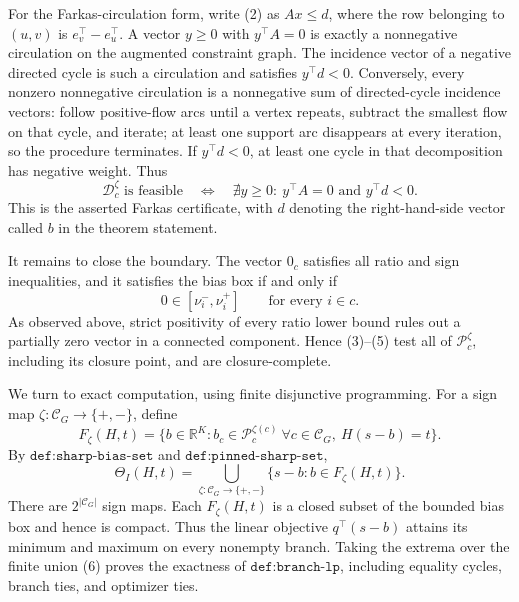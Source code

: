 For the Farkas-circulation form, write (2) as \(A x\le d\), where the row belonging to \((u,v)\) is \(e_v^{\top}-e_u^{\top}\).  A vector \(y\ge0\) with \(y^{\top}A=0\) is exactly a nonnegative circulation on the augmented constraint graph.  The incidence vector of a negative directed cycle is such a circulation and satisfies \(y^{\top}d<0\).  Conversely, every nonzero nonnegative circulation is a nonnegative sum of directed-cycle incidence vectors: follow positive-flow arcs until a vertex repeats, subtract the smallest flow on that cycle, and iterate; at least one support arc disappears at every iteration, so the procedure terminates.  If \(y^{\top}d<0\), at least one cycle in that decomposition has negative weight.  Thus
\[
 \mathcal D_c^{\zeta}\text{ is feasible}
 \quad\Longleftrightarrow\quad
 \nexists y\ge0:\ y^{\top}A=0\text{ and }y^{\top}d<0.
\tag{4}
\]
This is the asserted Farkas certificate, with \(d\) denoting the right-hand-side vector called \(b\) in the theorem statement.

It remains to close the boundary.  The vector \(0_c\) satisfies all ratio and sign inequalities, and it satisfies the bias box if and only if
\[
 0\in[\nu_i^-,\nu_i^+]\qquad\text{for every }i\in c.
\tag{5}
\]
As observed above, strict positivity of every ratio lower bound rules out a partially zero vector in a connected component.  Hence (3)--(5) test all of \(\mathcal P_c^{\zeta}\), including its closure point, and are closure-complete.

We turn to exact computation, using finite disjunctive programming.  For a sign map \(\zeta:\mathcal C_G\to\{+,-\}\), define
\[
 F_{\zeta}(H,t)
 =\{b\in\mathbb R^K:b_c\in\mathcal P_c^{\zeta(c)}\ \forall c\in\mathcal C_G,\ H(s-b)=t\}.
\]
By \(\texttt{def:sharp-bias-set}\) and \(\texttt{def:pinned-sharp-set}\),
\[
 \Theta_I(H,t)
 =\bigcup_{\zeta:\mathcal C_G\to\{+,-\}}
   \{s-b:b\in F_{\zeta}(H,t)\}.
\tag{6}
\]
There are \(2^{|\mathcal C_G|}\) sign maps.  Each \(F_{\zeta}(H,t)\) is a closed subset of the bounded bias box and hence is compact.  Thus the linear objective \(q^{\top}(s-b)\) attains its minimum and maximum on every nonempty branch.  Taking the extrema over the finite union (6) proves the exactness of \(\texttt{def:branch-lp}\), including equality cycles, branch ties, and optimizer ties.

